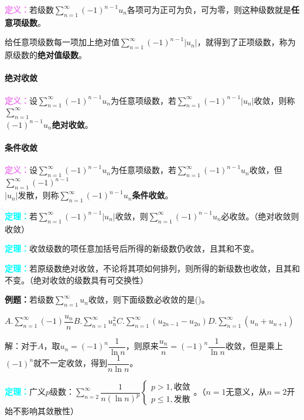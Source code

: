 \documentclass[UTF8, 12pt]{ctexart}
\begin{document}
\textcolor{violet}{\textbf{定义：}}若级数$\sum\limits_{n=1}^\infty(-1)^{n-1}u_n$各项可为正可为负，可为零，则这种级数就是\textbf{任意项级数}。

给任意项级数每一项加上绝对值$\sum\limits_{n=1}^\infty(-1)^{n-1}\vert u_n\vert$，就得到了正项级数，称为原级数的\textbf{绝对值级数}。

\paragraph{绝对收敛} \leavevmode \medskip

\textcolor{violet}{\textbf{定义：}}设$\sum\limits_{n=1}^\infty(-1)^{n-1}u_n$为任意项级数，若$\sum\limits_{n=1}^\infty(-1)^{n-1}\vert u_n\vert$收敛，则称$\sum\limits_{n=1}^\infty$\\$(-1)^{n-1}u_n$\textbf{绝对收敛}。

\paragraph{条件收敛} \leavevmode \medskip

\textcolor{violet}{\textbf{定义：}}设$\sum\limits_{n=1}^\infty(-1)^{n-1}u_n$为任意项级数，若$\sum\limits_{n=1}^\infty(-1)^{n-1}u_n$收敛，但$\sum\limits_{n=1}^\infty(-1)^{n-1}$\\$\vert u_n\vert$发散，则称$\sum\limits_{n=1}^\infty(-1)^{n-1}u_n$\textbf{条件收敛}。

\textcolor{aqua}{\textbf{定理：}}若$\sum\limits_{n=1}^\infty(-1)^{n-1}\vert u_n\vert$收敛，则$\sum\limits_{n=1}^\infty(-1)^{n-1}u_n$必收敛。（绝对收敛则收敛）

\textcolor{aqua}{\textbf{定理：}}收敛级数的项任意加括号后所得的新级数仍收敛，且其和不变。

\textcolor{aqua}{\textbf{定理：}}若原级数绝对收敛，不论将其项如何排列，则所得的新级数也收敛，且其和不变。（绝对收敛的级数具有可交换性）

\textbf{例题：}若级数$\sum\limits_{n=1}^\infty u_n$收敛，则下面级数必收敛的是()。

$A.\sum\limits_{n=1}^\infty(-1)\dfrac{u_n}{n}$\qquad$B.\sum\limits_{n=1}^\infty u_n^2$\qquad$C.\sum\limits_{n=1}^\infty(u_{2n-1}-u_{2n})$\qquad$D.\sum\limits_{n=1}^\infty(u_n+u_{n+1})$

解：对于$A$，取$u_n=(-1)^n\dfrac{1}{\ln n}$，则原来$\dfrac{u_n}{n}=(-1)^n\dfrac{1}{\ln n}$收敛，但是乘上$(-1)^n$就不一定收敛，得到$\dfrac{1}{n\ln n}$。

\textcolor{aqua}{\textbf{定理：}}广义$p$级数：$\sum\limits_{n=2}^\infty\dfrac{1}{n(\ln n)^p}\left\{\begin{array}{l}
    p>1, \text{收敛} \\
    p\leqslant1, \text{发散}
\end{array}\right.$。（$n=1$无意义，从$n=2$开始不影响其敛散性）
\end{document}
